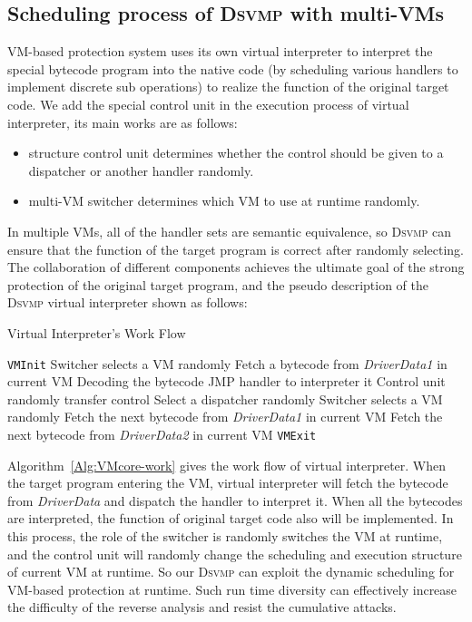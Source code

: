 \documentclass[preprint,12pt,3p]{elsarticle}
\newcommand{\DSVMP}{\textsc{Dsvmp}\xspace}
\begin{document}
\subsection{Scheduling process of \DSVMP with multi-VMs}\label{sec:mvm-2}
VM-based protection system uses its own virtual interpreter to interpret the special bytecode program into the native code
(by scheduling various handlers to implement discrete sub operations) to realize the function of the original target code.
We add the special control unit in the execution process of virtual interpreter, its main works are as follows:
\begin{itemize}
  \item structure control unit determines whether the control should be given to a dispatcher or another handler randomly.
  \item multi-VM switcher determines which VM to use at runtime randomly.
\end{itemize}

In multiple VMs, all of the handler sets are semantic equivalence,
so \DSVMP can ensure that the function of the target program is correct after randomly selecting.
The collaboration of different components achieves the ultimate goal of the strong protection of the original target program,
and the pseudo description of the \DSVMP virtual interpreter shown as follows:

\begin{algorithm}
\caption{Virtual Interpreter's Work Flow\label{Alg:VMcore-work}}
\begin{algorithmic}[1]
\STATE \texttt{VMInit}
\STATE Switcher selects a VM randomly
\STATE Fetch a bytecode from \emph{DriverData1} in current VM
\STATE Decoding the bytecode
\STATE JMP handler to interpreter it
\STATE Control unit randomly transfer control
\STATE Select a dispatcher randomly
\STATE Switcher selects a VM randomly
\STATE Fetch the next bytecode from \emph{DriverData1} in current VM
\STATE Fetch the next bytecode from \emph{DriverData2} in current VM
\ENDIF
\ENDWHILE
\STATE \texttt{VMExit}
\end{algorithmic}
\end{algorithm}

Algorithm~\ref{Alg:VMcore-work} gives the work flow of virtual interpreter.
When the target program entering the VM, virtual interpreter will fetch the bytecode from \emph{DriverData}
and dispatch the handler to interpret it.
When all the bytecodes are interpreted, the function of original target code also will be implemented.
In this process, the role of the switcher is randomly switches the VM at runtime,
and the control unit will randomly change the scheduling and execution structure of current VM at runtime.
So our \DSVMP can exploit the dynamic scheduling for VM-based protection at runtime.
Such run time diversity can effectively increase the difficulty of the reverse analysis and resist the cumulative attacks.
\end{document}
